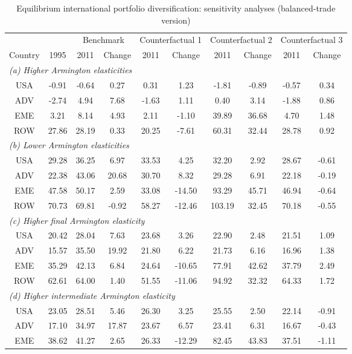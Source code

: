 \begin{table}[p]
\begin{center}
\caption{Equilibrium international portfolio diversification: sensitivity analyses (balanced-trade version)}
\label{tab:results-bal-div-sens}
\small
\begin{tabular}{cccccccccc}
\toprule
& & \multicolumn{2}{c}{Benchmark}& \multicolumn{2}{c}{Counterfactual 1}& \multicolumn{2}{c}{Counterfactual 2}& \multicolumn{2}{c}{Counterfactual 3}\\
\cmidrule(rl){3-4}\cmidrule(rl){5-6}\cmidrule(rl){7-8}\cmidrule(rl){9-10}
Country & 1995 & 2011 & Change & 2011 & Change & 2011 & Change & 2011 & Change\\
\midrule
\multicolumn{10}{l}{\textit{(a) Higher Armington elasticities}}\\
USA&-0.91&-0.64&0.27&0.31&1.23&-1.81&-0.89&-0.57&0.34\\
ADV&-2.74&4.94&7.68&-1.63&1.11&0.40&3.14&-1.88&0.86\\
EME&3.21&8.14&4.93&2.11&-1.10&39.89&36.68&4.70&1.48\\
ROW&27.86&28.19&0.33&20.25&-7.61&60.31&32.44&28.78&0.92\\
\midrule
\multicolumn{10}{l}{\textit{(b) Lower Armington elasticities}}\\
USA&29.28&36.25&6.97&33.53&4.25&32.20&2.92&28.67&-0.61\\
ADV&22.38&43.06&20.68&30.70&8.32&29.28&6.91&22.18&-0.19\\
EME&47.58&50.17&2.59&33.08&-14.50&93.29&45.71&46.94&-0.64\\
ROW&70.73&69.81&-0.92&58.27&-12.46&103.19&32.45&70.18&-0.55\\
\midrule
\multicolumn{10}{l}{\textit{(c) Higher final Armington elasticity}}\\
USA&20.42&28.04&7.63&23.68&3.26&22.90&2.48&21.51&1.09\\
ADV&15.57&35.50&19.92&21.80&6.22&21.73&6.16&16.96&1.38\\
EME&35.29&42.13&6.84&24.64&-10.65&77.91&42.62&37.79&2.49\\
ROW&62.61&64.00&1.40&51.55&-11.06&94.92&32.32&64.33&1.72\\
\midrule
\multicolumn{10}{l}{\textit{(d) Higher intermediate Armington elasticity}}\\
USA&23.05&28.51&5.46&26.30&3.25&25.55&2.50&22.14&-0.91\\
ADV&17.10&34.97&17.87&23.67&6.57&23.41&6.31&16.67&-0.43\\
EME&38.62&41.27&2.65&26.33&-12.29&82.45&43.83&37.51&-1.11\\

\end{tabular}
\end{center}
\end{table}
